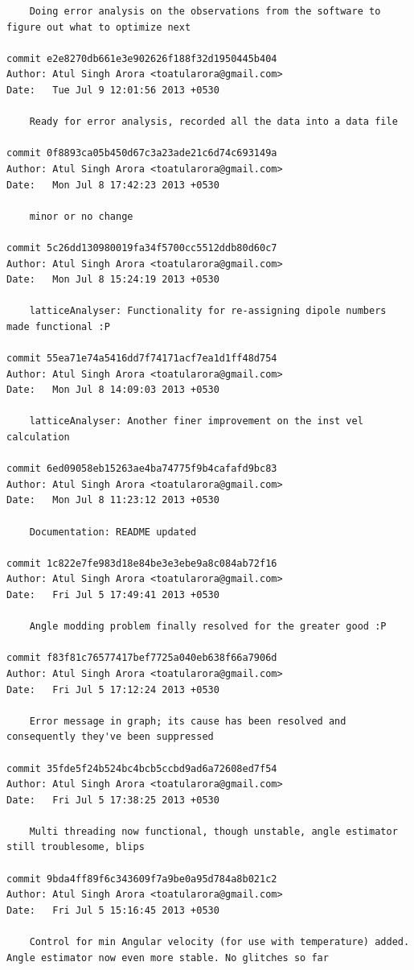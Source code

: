 \begin{lstlisting}
    Doing error analysis on the observations from the software to figure out what to optimize next

commit e2e8270db661e3e902626f188f32d1950445b404
Author: Atul Singh Arora <toatularora@gmail.com>
Date:   Tue Jul 9 12:01:56 2013 +0530

    Ready for error analysis, recorded all the data into a data file

commit 0f8893ca05b450d67c3a23ade21c6d74c693149a
Author: Atul Singh Arora <toatularora@gmail.com>
Date:   Mon Jul 8 17:42:23 2013 +0530

    minor or no change

commit 5c26dd130980019fa34f5700cc5512ddb80d60c7
Author: Atul Singh Arora <toatularora@gmail.com>
Date:   Mon Jul 8 15:24:19 2013 +0530

    latticeAnalyser: Functionality for re-assigning dipole numbers made functional :P

commit 55ea71e74a5416dd7f74171acf7ea1d1ff48d754
Author: Atul Singh Arora <toatularora@gmail.com>
Date:   Mon Jul 8 14:09:03 2013 +0530

    latticeAnalyser: Another finer improvement on the inst vel calculation

commit 6ed09058eb15263ae4ba74775f9b4cafafd9bc83
Author: Atul Singh Arora <toatularora@gmail.com>
Date:   Mon Jul 8 11:23:12 2013 +0530

    Documentation: README updated

commit 1c822e7fe983d18e84be3e3ebe9a8c084ab72f16
Author: Atul Singh Arora <toatularora@gmail.com>
Date:   Fri Jul 5 17:49:41 2013 +0530

    Angle modding problem finally resolved for the greater good :P

commit f83f81c76577417bef7725a040eb638f66a7906d
Author: Atul Singh Arora <toatularora@gmail.com>
Date:   Fri Jul 5 17:12:24 2013 +0530

    Error message in graph; its cause has been resolved and consequently they've been suppressed

commit 35fde5f24b524bc4bcb5ccbd9ad6a72608ed7f54
Author: Atul Singh Arora <toatularora@gmail.com>
Date:   Fri Jul 5 17:38:25 2013 +0530

    Multi threading now functional, though unstable, angle estimator still troublesome, blips

commit 9bda4ff89f6c343609f7a9be0a95d784a8b021c2
Author: Atul Singh Arora <toatularora@gmail.com>
Date:   Fri Jul 5 15:16:45 2013 +0530

    Control for min Angular velocity (for use with temperature) added. Angle estimator now even more stable. No glitches so far


\end{lstlisting}
